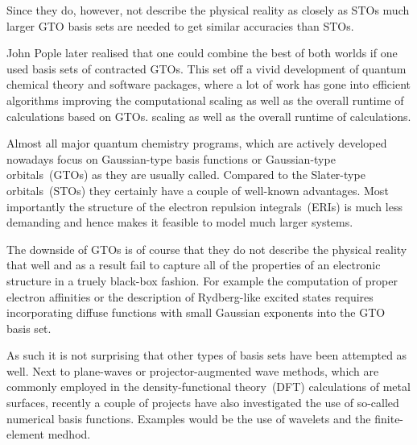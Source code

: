 Since they do, however, not describe the physical reality as closely as STOs
much larger GTO basis sets are needed to get similar accuracies than STOs.

John Pople
later realised that one could combine the best of both worlds if one used
basis sets of contracted GTOs.
This set off a vivid development of quantum chemical theory and software packages,
where a lot of work has gone into efficient algorithms
improving the computational
scaling as well as the overall runtime of calculations based on GTOs.
scaling as well as the overall runtime of calculations.

Almost all major quantum chemistry programs,
which are actively developed nowadays focus on Gaussian-type
basis functions or Gaussian-type orbitals~(GTOs) as they are usually called.
Compared to the Slater-type orbitals~(STOs)
they certainly have a couple of well-known advantages.
Most importantly the structure of the electron repulsion integrals~(ERIs)
is much less demanding and hence makes it feasible to model much larger systems.

The downside of GTOs is of course that they do not describe the physical
reality that well and as a result fail to capture all of the properties
of an electronic structure in a truely black-box fashion.
For example the computation of proper electron affinities or the description
of Rydberg-like excited states requires incorporating diffuse functions
with small Gaussian exponents into the GTO basis set.

As such it is not surprising that other types of basis sets have been attempted as well.
Next to plane-waves or projector-augmented wave methods,
which are commonly employed in the density-functional theory~(DFT)
calculations of metal surfaces,
recently a couple of projects have also investigated the use
of so-called numerical basis functions.
Examples would be the use of wavelets and the finite-element medhod.


